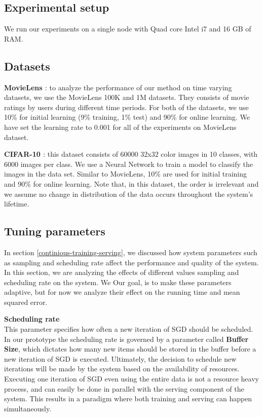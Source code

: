 \documentclass{sig-alternate-05-2015}
\begin{document}
\subsection{Experimental setup}
We run our experiments on a single node with Quad core Intel i7 and 16 GB of RAM. 

\subsection{Datasets}
\textbf{MovieLens \cite{harper2016movielens}}: to analyze the performance of our method on time varying datasets, we use the MovieLens 100K and 1M datasets. 
They consists of movie ratings by users during different time periods. 
For both of the datasets, we use 10\% for initial learning (9\% training, 1\% test) and 90\% for online learning. 
We have set the learning rate to 0.001 for all of the experiments on MovieLens dataset.

\textbf{CIFAR-10 \cite{krizhevsky2009learning}}: this dataset consists of 60000 32x32 color images in 10 classes, with 6000 images per class. We use a Neural Network to train a model to classify the images in the data set. Similar to MovieLens, 10\% are used for initial training and 90\% for online learning. Note that, in this dataset, the order is irrelevant and we assume no change in distribution of the data occurs throughout the system's lifetime. 

\subsection{Tuning parameters} \label{tuning}
In section \ref{continious-training-serving}, we discussed how system parameters such as sampling and scheduling rate affect the performance and quality of the system.
In this section, we are analyzing the effects of different values sampling and scheduling rate on the system.
We 
Our goal, is to make these parameters adaptive, but for now we analyze their effect on the running time and mean squared error. 

\textbf{Scheduling rate}\\
This parameter specifies how often a new iteration of SGD should be scheduled. 
In our prototype the scheduling rate is governed by a parameter called \textbf{Buffer Size}, which dictates how many new items should be stored in the buffer before a new iteration of SGD is executed. 
Ultimately, the decision to schedule new iterations will be made by the system based on the availability of resources. 
Executing one iteration of SGD even using the entire data is not a resource heavy process, and can easily be done in parallel with the serving component of the system. 
This results in a paradigm where both training and serving can happen simultaneously. 
\end{document}
